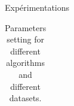 \documentclass{beamer}
\begin{document}
\begin{frame}{Expérimentations}
	\begin{small}
	\begin{table}[h]
		\caption{Parameters setting for different algorithms and different datasets. }
		
		\begin{center}
			\begin{tabular}{llllll}
				

\end{tabular}
\end{center}
\end{table}
\end{small}
\end{frame}
\end{document}
